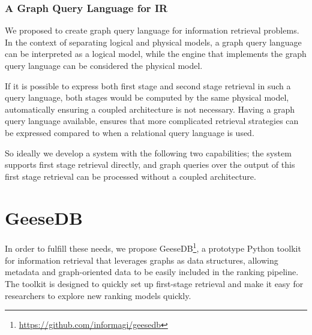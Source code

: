 \subsubsection{A Graph Query Language for IR}
We \citep{need-graph-db} proposed to create graph query language for information retrieval problems. In the context of separating logical and physical models, a graph query language can be interpreted as a logical model, while the engine that implements the graph query language can be considered the physical model.

If it is possible to express both first stage and second stage retrieval in such a query language, both stages would be computed by the same physical model, automatically ensuring a coupled architecture is not necessary. Having a graph query language available, ensures that more complicated retrieval strategies can be expressed compared to when a relational query language is used. 

So ideally we develop a system with the following two capabilities; the system supports first stage retrieval directly, and graph queries over the output of this first stage retrieval can be processed without a coupled architecture.  

\section{GeeseDB}
In order to fulfill these needs, we propose GeeseDB\footnote{\url{https://github.com/informagi/geesedb}}, a prototype Python toolkit for information retrieval that leverages graphs as data structures, allowing metadata and graph-oriented data to be easily included in the ranking pipeline. The toolkit is designed to quickly set up first-stage retrieval and make it easy for researchers to explore new ranking models quickly. 


